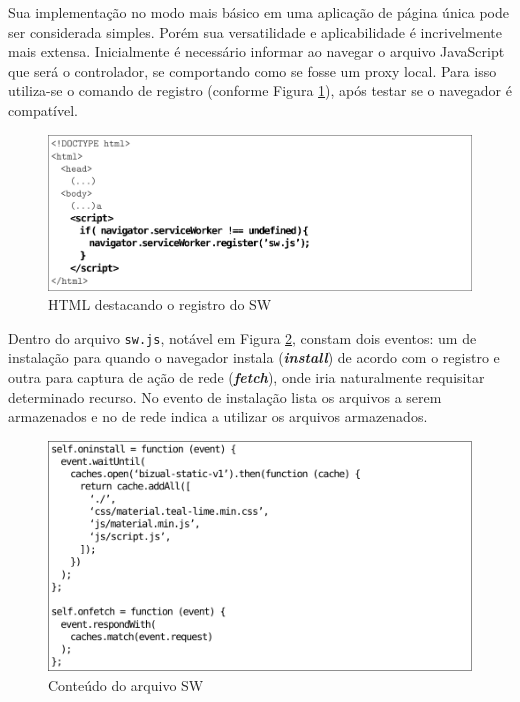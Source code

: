 \documentclass[12pt]{article}
\begin{document}
Sua implementação no modo mais básico em uma aplicação de página única pode ser considerada simples. Porém sua versatilidade e aplicabilidade é incrivelmente mais extensa. Inicialmente é necessário informar ao navegar o arquivo JavaScript que será o controlador, se comportando como se fosse um proxy local. Para isso utiliza-se o comando de registro (conforme Figura \ref{fig:swregister}), após testar se o navegador é compatível.

\begin{figure}[ht]
\centering
\includegraphics[width=.85\textwidth,keepaspectratio]{figures/html.pdf}
\caption{HTML destacando o registro do SW}
\label{fig:swregister}
\end{figure}

Dentro do arquivo \texttt{sw.js}, notável em Figura \ref{fig:swjs}, constam dois eventos: um de instalação para quando o navegador instala (\textbf{\textit{install}}) de acordo com o registro e outra para captura de ação de rede (\textbf{\textit{fetch}}), onde iria naturalmente requisitar determinado recurso. No evento de instalação lista os arquivos a serem armazenados e no de rede indica a utilizar os arquivos armazenados.

\begin{figure}[ht]
\centering
\includegraphics[width=.85\textwidth,keepaspectratio]{figures/sw.pdf}
\caption{Conteúdo do arquivo SW}
\label{fig:swjs}
\end{figure}
\end{document}
